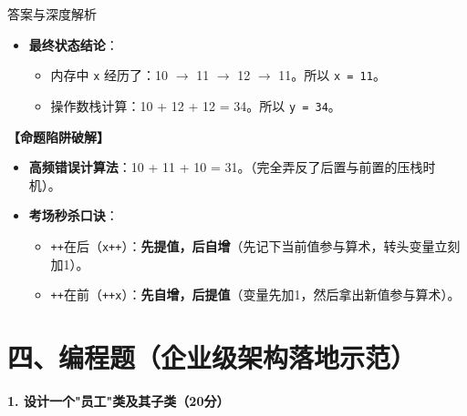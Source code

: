 \documentclass[12pt, a4paper]{ctexart}
\begin{document}
\begin{enumerate}[label=\textbf{\arabic*.}]
\begin{bluebox}{答案与深度解析}
\begin{itemize}[leftmargin=*, nosep]
			      \item \textbf{最终状态结论}：
			            \begin{itemize}
				            \item 内存中 \texttt{x} 经历了：10 $\rightarrow$ 11 $\rightarrow$ 12 $\rightarrow$ 11。所以 \texttt{x = 11}。
				            \item 操作数栈计算：10 + 12 + 12 = 34。所以 \texttt{y = 34}。
			            \end{itemize}
		      \end{itemize}

		      \textbf{【命题陷阱破解】}
		      \begin{itemize}[leftmargin=*, nosep]
			      \item \textbf{高频错误计算法}：10 + 11 + 10 = 31。（完全弄反了后置与前置的压栈时机）。
			      \item \textbf{考场秒杀口诀}：
			            \begin{itemize}
				            \item \texttt{++}在后（\texttt{x++}）：\textbf{先提值，后自增}（先记下当前值参与算术，转头变量立刻加1）。
				            \item \texttt{++}在前（\texttt{++x}）：\textbf{先自增，后提值}（变量先加1，然后拿出新值参与算术）。
			            \end{itemize}
		      \end{itemize}
	      \end{bluebox}
\end{enumerate}

\newpage
\section{四、编程题（企业级架构落地示范）}

\textbf{1. 设计一个"员工"类及其子类（20分）}
\end{document}
